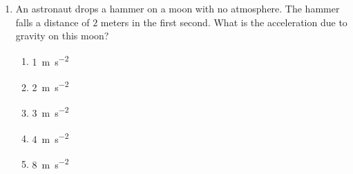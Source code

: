 \documentclass{../../oss-apphys}
\begin{document}
\begin{multicols}{2}
\begin{enumerate}[resume,leftmargin=18pt]
    
  \item An astronaut drops a hammer on a moon with no atmosphere. The hammer
    falls a distance of $2$ meters in the first second. What is the
    acceleration due to gravity on this moon?
    \begin{enumerate}[noitemsep,topsep=0pt,leftmargin=18pt,label=(\Alph*)]
    \item\SI{1}{\metre\per\second^2}
    \item\SI{2}{\metre\per\second^2}
    \item\SI{3}{\metre\per\second^2}
    \item\SI{4}{\metre\per\second^2}
    \item\SI{8}{\metre\per\second^2}
    \end{enumerate}

    

\end{enumerate}
\end{multicols}
\end{document}
